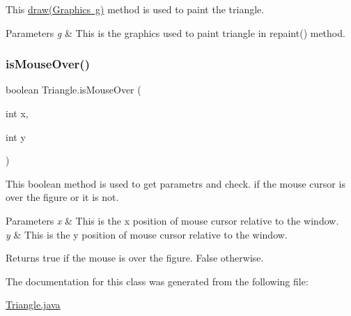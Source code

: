 This \mbox{\hyperlink{class_triangle_a66f33cc53576b642a0b3a6893b3141d4}{draw(\+Graphics g)}} method is used to paint the triangle. 
\begin{DoxyParams}{Parameters}
{\em g} & This is the graphics used to paint triangle in repaint() method. \\
\hline
\end{DoxyParams}
\mbox{\label{class_triangle_af43f66b724b415c4a3a94567de67e9c6}} 
\subsubsection{\texorpdfstring{isMouseOver()}{isMouseOver()}}
{\footnotesize\ttfamily boolean Triangle.\+is\+Mouse\+Over (\begin{DoxyParamCaption}\item[{int}]{x,  }\item[{int}]{y }\end{DoxyParamCaption})}

This boolean method is used to get parametrs and check. if the mouse cursor is over the figure or it is not. 
\begin{DoxyParams}{Parameters}
{\em x} & This is the x position of mouse cursor relative to the window. \\
\hline
{\em y} & This is the y position of mouse cursor relative to the window. \\
\hline
\end{DoxyParams}
\begin{DoxyReturn}{Returns}
true if the mouse is over the figure. False otherwise. 
\end{DoxyReturn}


The documentation for this class was generated from the following file\+:\begin{DoxyCompactItemize}
\item 
\mbox{\hyperlink{_triangle_8java}{Triangle.\+java}}\end{DoxyCompactItemize}
